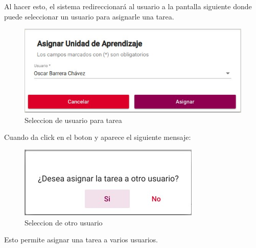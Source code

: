             Al hacer esto, el sistema redireccionará al usuario a la pantalla siguiente donde puede seleccionar un usuario para asignarle una tarea.

            \begin{figure}[H]
                \centering
                \hypertarget{asigna}{\includegraphics[width=0.7\linewidth]{images/Tareas/Asignando}}
                \caption{Seleccion de usuario para tarea}
                \label{asigna}
            \end{figure}

           Cuando da click en el boton  y aparece el siguiente mensaje:
            \begin{figure}[H]
                \centering
                \hypertarget{asignar}{\includegraphics[width=0.7\linewidth]{images/Tareas/Asignarotro}}
                \caption{Seleccion de otro usuario}
                \label{asignar}
            \end{figure}
            Esto permite asignar una tarea a varios usuarios.



